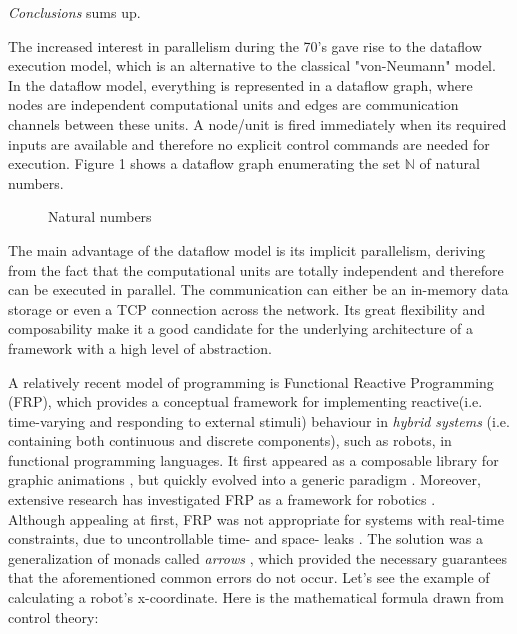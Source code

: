 \documentclass{dithesis}
\begin{document}
\textit{Conclusions} sums up.


The increased interest in parallelism during the 70's gave rise to the dataflow execution model, which is an alternative to the classical "von-Neumann" model. In the dataflow model, everything is represented in a dataflow graph, where nodes are independent computational units  and edges are communication channels between these units. A node/unit is fired immediately when its required inputs are available and therefore no explicit control commands are needed for execution. Figure 1 shows a dataflow graph enumerating the set $\mathbb{N}$ of natural numbers.

\begin{figure}[h!]
	\centering
		
	\caption{Natural numbers}
\end{figure}


The main advantage of the dataflow model is its implicit parallelism, deriving from the fact that the computational units are totally independent and therefore can be executed in parallel. The communication can either be an in-memory data storage or even a TCP connection across the network. Its great flexibility and composability make it a good candidate for the underlying architecture of a framework with a high level of abstraction.

A relatively recent model of programming is Functional Reactive Programming (FRP), which provides a conceptual framework for implementing reactive(i.e. time-varying and responding to external stimuli) behaviour in \textit{hybrid systems} (i.e. containing both continuous and discrete components), such as robots, in functional programming languages. It first appeared as a composable library for graphic animations \cite{fran}, but quickly evolved into a generic paradigm \cite{survey_frp,real_frp,pushpull_frp}. Moreover, extensive research has investigated FRP as a framework for robotics \cite{arrows_robots,lambda_in_motion}. \\
Although appealing at first, FRP was not appropriate for systems  with real-time constraints, due to uncontrollable time- and space- leaks \cite{event_frp}. The solution was a generalization of monads called \textit{arrows} \cite{arrows}, which provided the necessary guarantees that the aforementioned common errors do not occur. Let's see the example of calculating a robot's x-coordinate. Here is the mathematical formula drawn from control theory:
\end{document}
